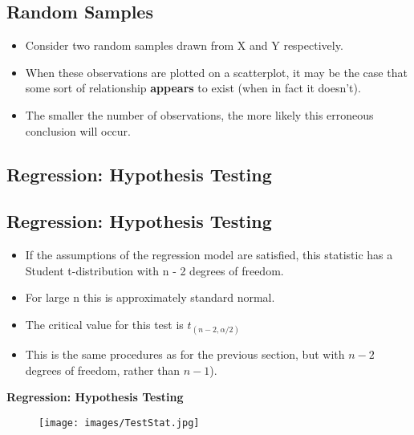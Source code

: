 \documentclass[]{report}
\begin{document}
\subsection{Random Samples}
\begin{itemize}
	\item Consider two random samples drawn from X and Y respectively.
	\item When these observations are plotted on a scatterplot, it
	may be the case that some sort of relationship \textbf{appears} to exist (when in fact it doesn't).
	\item The smaller the number of observations, the more likely this erroneous conclusion will occur.
\end{itemize}





\subsection{Regression: Hypothesis Testing}
%

\subsection{Regression: Hypothesis Testing}
\begin{itemize}
	\item If the assumptions of the regression model are satisfied, this
	statistic has a Student t-distribution with n - 2 degrees of freedom.
	\item For large n this is approximately standard normal.
	\item The critical value for this test is $t_{(n-2,\alpha/2)}$
	\item This is the same procedures as for the previous section, but with $n-2$ degrees of freedom, rather than $n-1$).
\end{itemize}




\textbf{Regression: Hypothesis Testing}
\begin{figure}
	\texttt{[image: images/TestStat.jpg]}\\
\end{figure}
\end{document}
